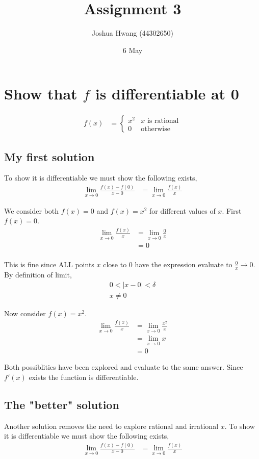 \documentclass{article}
\title{Assignment 3}
\author{Joshua Hwang (44302650)}
\date{6 May}
\begin{document}
\maketitle

\section{Show that $f$ is differentiable at 0}
\begin{align*}
    f(x)
    &=
    \begin{cases}
        x^2 & \text{$x$ is rational} \\
        0 & \text{otherwise}
    \end{cases}
\end{align*}

\subsection{My first solution}
To show it is differentiable we must show the following exists,
\begin{align*}
    \lim_{x \to 0} \frac{f(x) - f(0)}{x - 0}
    &= \lim_{x \to 0} \frac{f(x)}{x}
\end{align*}

We consider both $f(x) = 0$ and $f(x) = x^2$ for different values of $x$.
First $f(x) = 0$.
\begin{align*}
    \lim_{x \to 0} \frac{f(x)}{x} &= \lim_{x \to 0} \frac{0}{x} \\
    &= 0 \\
\end{align*}

This is fine since ALL points $x$ close to 0 have the expression evaluate to
$\frac{0}{x} \to 0$. By definition of limit,
\begin{align*}
0 < |x - 0| < \delta \\
x \neq 0
\end{align*}

Now consider $f(x) = x^2$.
\begin{align*}
    \lim_{x \to 0} \frac{f(x)}{x} &= \lim_{x \to 0} \frac{x^2}{x} \\
    &= \lim_{x \to 0} x \\
    &=  0
\end{align*}

Both possiblities have been explored and evaluate to the same answer. Since
$f'(x)$ exists the function is differentiable.

\subsection{The "better" solution}
Another solution removes the need to explore rational and irrational $x$.
To show it is differentiable we must show the following exists,
\begin{align*}
    \lim_{x \to 0} \frac{f(x) - f(0)}{x - 0}
    &= \lim_{x \to 0} \frac{f(x)}{x}
\end{align*}
\end{document}
